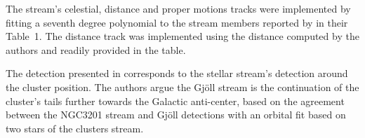 The stream's celestial, distance and proper motions tracks were implemented by fitting a seventh degree polynomial to the stream members reported by \citet{Ibata2021} in their Table~1. The distance track was implemented using the distance computed by the authors and readily provided in the table.

The detection presented in \citet{Ibata2021} corresponds to the stellar stream's detection around the cluster position. The authors argue the Gj\"oll stream is the continuation of the cluster's tails further towards the Galactic anti-center, based on the agreement between the NGC3201 stream and Gj\"oll detections with an orbital fit based on two stars of the clusters stream. 

